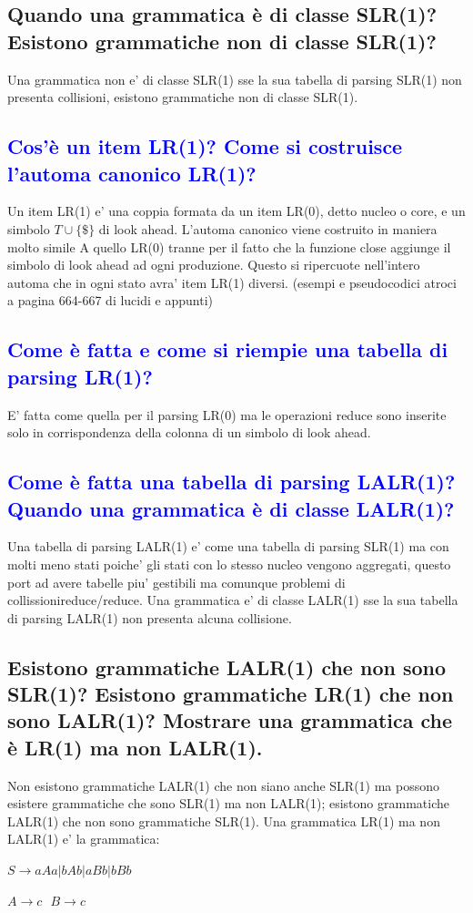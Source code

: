 \documentclass{article}
\begin{document}
    \subsection{Quando una grammatica è di classe SLR(1)? Esistono grammatiche non di classe SLR(1)?}
    Una grammatica non e' di classe SLR(1) sse la sua tabella di parsing SLR(1) non
    presenta collisioni, esistono grammatiche non di classe SLR(1).
    \subsection{\textcolor{blue}{Cos'è un item LR(1)? Come si costruisce l'automa canonico LR(1)?}}
    Un item LR(1) e' una coppia formata da un item LR(0), detto nucleo o core, e un simbolo $T\cup\{\$\}$ di look ahead. L'automa canonico viene costruito in maniera molto simile A
    quello LR(0) tranne per il fatto che la funzione close aggiunge il simbolo di look ahead ad ogni produzione. Questo si ripercuote nell'intero automa che in ogni stato avra' item LR(1) diversi. (esempi e
    pseudocodici atroci a pagina 664-667 di lucidi e appunti)
    \subsection{\textcolor{blue}{Come è fatta e come si riempie una tabella di parsing LR(1)?}}
    E' fatta come quella per il parsing LR(0) ma le operazioni reduce sono inserite solo in corrispondenza della colonna di un simbolo di look ahead.
    \subsection{\textcolor{blue}{Come è fatta una tabella di parsing LALR(1)? Quando una grammatica è di classe LALR(1)?}}
    Una tabella di parsing LALR(1) e' come una tabella di parsing SLR(1) ma con molti meno stati poiche' gli stati con lo stesso nucleo vengono aggregati, questo port ad avere tabelle piu' gestibili ma comunque problemi di collissionireduce/reduce.
    Una grammatica e' di classe LALR(1) sse la sua tabella di parsing LALR(1) non presenta alcuna collisione.
    \subsection{Esistono grammatiche LALR(1) che non sono SLR(1)? Esistono grammatiche LR(1) che non sono LALR(1)? Mostrare una grammatica che è LR(1) ma non LALR(1).}
    Non esistono grammatiche LALR(1) che non siano anche SLR(1) ma possono esistere
    grammatiche che sono SLR(1) ma non LALR(1); esistono grammatiche LALR(1) che
    non sono grammatiche SLR(1). Una grammatica LR(1) ma non LALR(1) e' la
    grammatica:
    \begin{center}
        $S\to aAa|bAb|aBb|bBb$

        $A\to c\   \    \   B\to c$
    \end{center}
\end{document}
